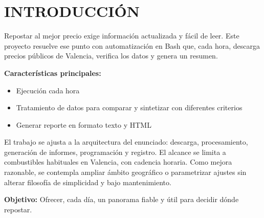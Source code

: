 \chapter{INTRODUCCIÓN}

Repostar al mejor precio exige información actualizada y fácil de leer. Este proyecto resuelve ese punto con automatización en Bash que, cada hora, descarga precios públicos de Valencia, verifica los datos y genera un resumen.

\vspace{0.5cm}
\textbf{Características principales:}
\begin{itemize}[noitemsep]
  \item Ejecución cada hora
  \item Tratamiento de datos para comparar y sintetizar con diferentes criterios
  \item Generar reporte en formato texto y HTML
\end{itemize}

El trabajo se ajusta a la arquitectura del enunciado: descarga, procesamiento, generación de informes, programación y registro. El alcance se limita a combustibles habituales en Valencia, con cadencia horaria. Como mejora razonable, se contempla ampliar ámbito geográfico o parametrizar ajustes sin alterar filosofía de simplicidad y bajo mantenimiento.

\textbf{Objetivo:} Ofrecer, cada día, un panorama fiable y útil para decidir dónde repostar.
